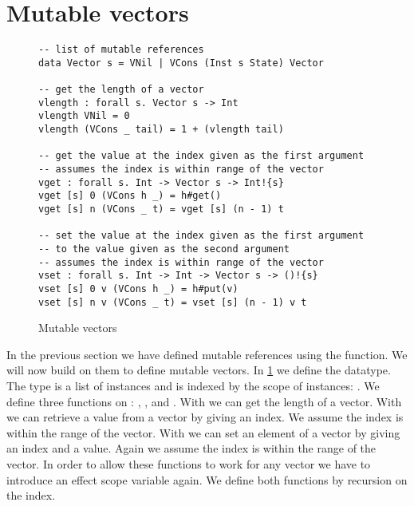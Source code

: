 \section{Mutable vectors}
\label{sec:lang-vectors}
\begin{figure}[h]
\caption{Mutable vectors}
\begin{verbatim}
-- list of mutable references
data Vector s = VNil | VCons (Inst s State) Vector

-- get the length of a vector
vlength : forall s. Vector s -> Int
vlength VNil = 0
vlength (VCons _ tail) = 1 + (vlength tail)

-- get the value at the index given as the first argument
-- assumes the index is within range of the vector
vget : forall s. Int -> Vector s -> Int!{s}
vget [s] 0 (VCons h _) = h#get()
vget [s] n (VCons _ t) = vget [s] (n - 1) t

-- set the value at the index given as the first argument
-- to the value given as the second argument
-- assumes the index is within range of the vector
vset : forall s. Int -> Int -> Vector s -> ()!{s}
vset [s] 0 v (VCons h _) = h#put(v)
vset [s] n v (VCons _ t) = vset [s] (n - 1) v t
\end{verbatim}
\label{fig:vectors}
\end{figure}

In the previous section we have defined mutable references using the  function.
We will now build on them to define mutable vectors.
In \cref{fig:vectors} we define the  datatype.
The type  is a list of  instances and is indexed by the scope of instances: .
We define three functions on : , , and .
With  we can get the length of a vector.
With  we can retrieve a value from a vector by giving an index.
We assume the index is within the range of the vector.
With  we can set an element of a vector by giving an index and a value.
Again we assume the index is within the range of the vector.
In order to allow these functions to work for any vector we have to introduce an effect scope variable  again.
We define both functions by recursion on the index.

